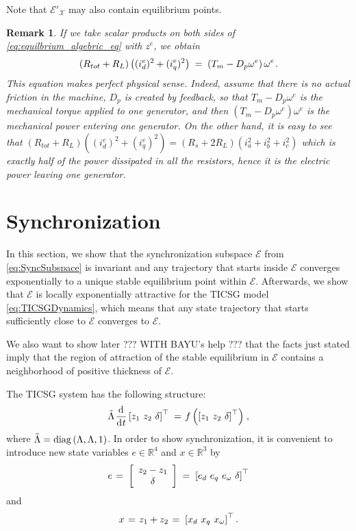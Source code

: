 \documentclass[letterpaper, 10 pt, conference]{ieeeconf}
\newtheorem{remark}[theorem]{Remark}
\newcommand{\rline}  {{\mathbb R}}
\renewcommand{\L}    {{\Lambda}}
\renewcommand{\o}    {{\omega}}
\newcommand{\m}      {{\hbox{\hskip 1pt}}}
\newcommand{\dd}     {{\rm d\hbox{\hskip 0.5pt}}}
\newcommand{\Emscr}  {{\mathcal{E}}}
\newcommand{\Xmscr}  {{\mathcal{X}}}
\begin{document}
Note that $\Emscr'_\Xmscr$ may also contain equilibrium points.

\begin{remark}
If we take scalar products on both sides of 
\eqref{eq:equilbrium_algebric_eq} with $z^e$, we obtain
$$ \left(R_{tot}+R_L\right)\left((i_d^e)^2+(i_q^e)^2\right) \m=\m
   \left(T_m-D_p\o^e\right)\o^e \m.$$
This equation makes perfect physical sense. Indeed, assume that there
is no actual friction in the machine, $D_{p}$ is created by feedback,
so that $T_{m}-D_{p}\omega^{e}$ is the mechanical torque applied to
one generator, and then $\left(T_{m}-D_{p}\omega^{e}\right)\omega^{e}$
is the mechanical power entering one generator. On the other hand, it
is easy to see that $\left(R_{tot}+R_L\right)\left((i_d^e)^2+
(i_q^e)^2\right)=\left(R_s+2R_L\right)\left(i_a^2+i_b^2+i_c^2\right)$
which is exactly half of the power dissipated in all the resistors,
hence it is the electric power leaving one generator.
\end{remark}

\section{Synchronization} \label{sec5} %

In this section, we show that the synchronization subspace $\Emscr$ 
from \eqref{eq:SyncSubspace} is invariant and any trajectory that 
starts inside $\Emscr$ converges exponentially to a unique stable 
equilibrium point within $\Emscr$. Afterwards, we show that $\Emscr$
is locally exponentially attractive for the TICSG model 
\eqref{eq:TICSGDynamics}, which means that any state trajectory that 
starts sufficiently close to $\Emscr$ converges to $\Emscr$. 

We also want to show later ??? WITH BAYU's help ??? that the 
facts just stated imply that the region of attraction of the stable 
equilibrium in $\Emscr$ contains a neighborhood of positive thickness
of $\Emscr$.

The TICSG system has the following structure: \vspace{-1mm}
$$ \tilde{\L}\m\frac{\dd}{\dd t}\left[z_1\ z_2\ \delta\right]^{\top}
   \m=\m f\left( \left[z_1\ z_2\ \delta\right]^{\top} \right) \m,$$
where $\tilde{\L}={\rm diag}\left(\L,\L,1\right)$. In order to show 
synchronization, it is convenient to introduce new 
state variables $e\in\rline^4$ and $x\in\rline^3$ by \vspace{-2mm}
$$ e \m=\m \left[ \begin{array}{c} z_2 - z_1\\ \delta \end{array} 
   \right] \m=\m \left[e_d\ e_q\ e_\o\ \delta \right]^\top$$
and \vspace{-2mm}
$$x \m=\m z_1+z_2 \m=\m \left[ x_d\ x_q\ x_\o\right]^\top .$$  
\end{document}
